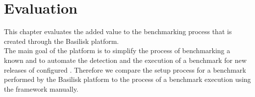 \chapter{Evaluation}
\label{ch:evaluation}

This chapter evaluates the added value to the benchmarking process that is created through the Basilisk platform.
\\

The main goal of the platform is to simplify the process of benchmarking a known \tsp{} and to automate the detection and the execution of a benchmark for new releases of configured \tsp{}.
Therefore we compare the setup process for a benchmark performed by the Basilisk platform to the process of a benchmark execution using the \iguana{} framework manually.





